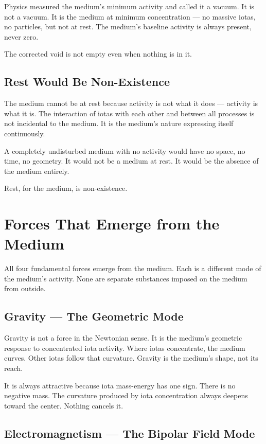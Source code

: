 \documentclass[11pt]{article}
\begin{document}
Physics measured the medium's minimum activity and called it a vacuum. It is not
a vacuum. It is the medium at minimum concentration — no massive iotas, no
particles, but not at rest. The medium's baseline activity is always present,
never zero.

The corrected void is not empty even when nothing is in it.

\subsection{Rest Would Be Non-Existence}
\label{sec:org8538007}

The medium cannot be at rest because activity is not what it does — activity is
what it is. The interaction of iotas with each other and between all processes is
not incidental to the medium. It is the medium's nature expressing itself
continuously.

A completely undisturbed medium with no activity would have no space, no time,
no geometry. It would not be a medium at rest. It would be the absence of the
medium entirely.

Rest, for the medium, is non-existence.

\section{Forces That Emerge from the Medium}
\label{sec:org40a89ca}

All four fundamental forces emerge from the medium. Each is a different mode of
the medium's activity. None are separate substances imposed on the medium from
outside.

\subsection{Gravity — The Geometric Mode}
\label{sec:orge593730}

Gravity is not a force in the Newtonian sense. It is the medium's geometric
response to concentrated iota activity. Where iotas concentrate, the medium
curves. Other iotas follow that curvature. Gravity is the medium's shape, not
its reach.

It is always attractive because iota mass-energy has one sign. There is no
negative mass. The curvature produced by iota concentration always deepens toward
the center. Nothing cancels it.

\subsection{Electromagnetism — The Bipolar Field Mode}
\label{sec:org98c4afe}
\end{document}
